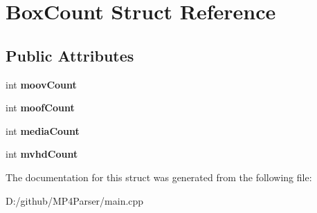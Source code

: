 \hypertarget{struct_box_count}{}\section{Box\+Count Struct Reference}
\label{struct_box_count}
\subsection*{Public Attributes}
\begin{DoxyCompactItemize}
\item 
\mbox{\label{struct_box_count_af3cd0a3a96b2194be5086d45b2b587fc}} 
int {\bfseries moov\+Count}
\item 
\mbox{\label{struct_box_count_adf097add1001a891d6cfe3473f01935e}} 
int {\bfseries moof\+Count}
\item 
\mbox{\label{struct_box_count_a0933d9da968b8df45439754d8aa8c2ba}} 
int {\bfseries media\+Count}
\item 
\mbox{\label{struct_box_count_a1a99153887c517096ca73497fced1046}} 
int {\bfseries mvhd\+Count}
\end{DoxyCompactItemize}


The documentation for this struct was generated from the following file\+:\begin{DoxyCompactItemize}
\item 
D\+:/github/\+M\+P4\+Parser/main.\+cpp\end{DoxyCompactItemize}
